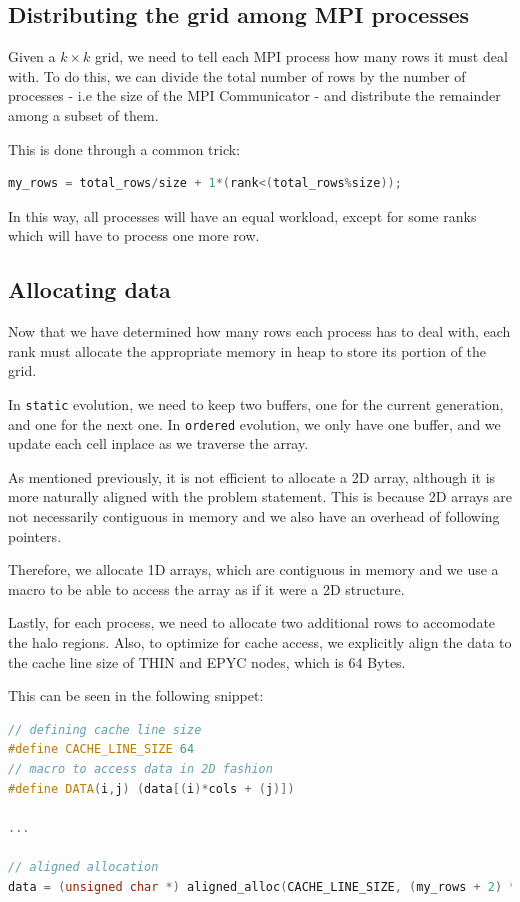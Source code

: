 \documentclass{report}
\begin{document}
\subsection{Distributing the grid among MPI processes}

Given a $k \times k$ grid, we need to tell each MPI process how many rows it must 
deal with.
To do this, we can divide the total number of rows by the number of processes - i.e 
the size of the MPI Communicator - and distribute the remainder among a subset 
of them.

This is done through a common trick:
\begin{lstlisting}[language=C++]
    my_rows = total_rows/size + 1*(rank<(total_rows%size));
\end{lstlisting}

In this way, all processes will have an equal workload, except for some ranks 
which will have to process one more row.

\subsection{Allocating data}

Now that we have determined how many rows each process has to deal with, each 
rank must allocate the appropriate memory in heap to store its portion of the 
grid.

In \texttt{static} evolution, we need to keep two buffers, one for the current 
generation, and one for the next one. 
In \texttt{ordered} evolution, we only have one buffer, 
and we update each cell inplace as we traverse the array.

As mentioned previously, it is not efficient to allocate a 2D array, although it 
is more naturally aligned with the problem statement. This is because 2D arrays 
are not necessarily contiguous in memory and we also have an overhead of 
following pointers.

Therefore, we allocate 1D arrays, which are contiguous in memory and we use 
a macro to be able to access the array as if it were a 2D structure. 

Lastly, for each process, we need to allocate two additional rows to accomodate 
the halo regions. Also, to optimize for cache access, we explicitly align the data 
to the cache line size of THIN and EPYC nodes, which is 64 Bytes.

This can be seen in the following snippet:

\begin{lstlisting}[language=C++]
// defining cache line size
#define CACHE_LINE_SIZE 64
// macro to access data in 2D fashion
#define DATA(i,j) (data[(i)*cols + (j)])

... 

// aligned allocation
data = (unsigned char *) aligned_alloc(CACHE_LINE_SIZE, (my_rows + 2) * cols);
\end{lstlisting}
\end{document}
